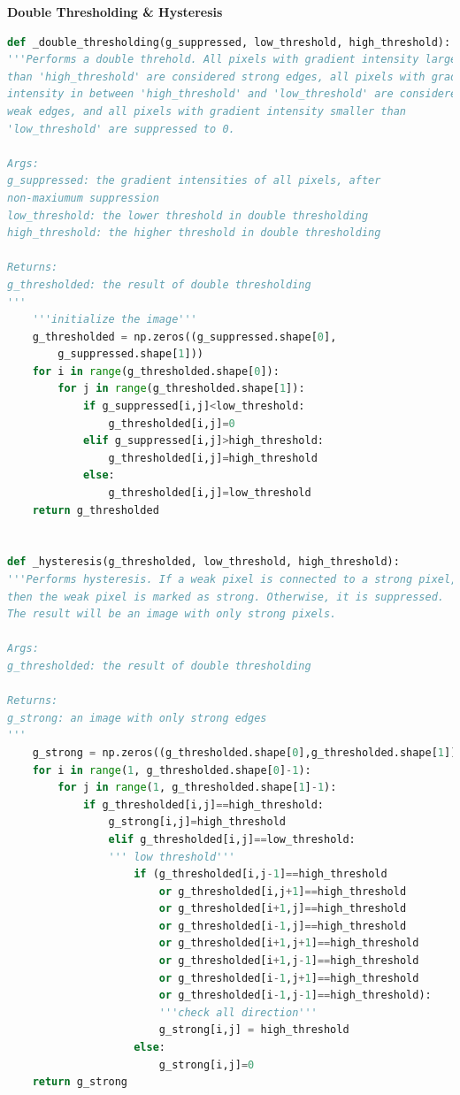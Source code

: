 \documentclass[12pt]{article}
\begin{document}
\pagebreak
\textbf{Double Thresholding \& Hysteresis}
\begin{lstlisting}[language=Python]
def _double_thresholding(g_suppressed, low_threshold, high_threshold):
'''Performs a double threhold. All pixels with gradient intensity larger
than 'high_threshold' are considered strong edges, all pixels with gradient
intensity in between 'high_threshold' and 'low_threshold' are considered
weak edges, and all pixels with gradient intensity smaller than
'low_threshold' are suppressed to 0.

Args:
g_suppressed: the gradient intensities of all pixels, after
non-maxiumum suppression
low_threshold: the lower threshold in double thresholding
high_threshold: the higher threshold in double thresholding

Returns:
g_thresholded: the result of double thresholding
'''
	'''initialize the image'''
	g_thresholded = np.zeros((g_suppressed.shape[0],
		g_suppressed.shape[1]))
	for i in range(g_thresholded.shape[0]):
		for j in range(g_thresholded.shape[1]):
			if g_suppressed[i,j]<low_threshold:
				g_thresholded[i,j]=0
			elif g_suppressed[i,j]>high_threshold:
				g_thresholded[i,j]=high_threshold
			else:
				g_thresholded[i,j]=low_threshold
	return g_thresholded


def _hysteresis(g_thresholded, low_threshold, high_threshold):
'''Performs hysteresis. If a weak pixel is connected to a strong pixel,
then the weak pixel is marked as strong. Otherwise, it is suppressed.
The result will be an image with only strong pixels.

Args:
g_thresholded: the result of double thresholding

Returns:
g_strong: an image with only strong edges
'''
	g_strong = np.zeros((g_thresholded.shape[0],g_thresholded.shape[1]))
	for i in range(1, g_thresholded.shape[0]-1):
		for j in range(1, g_thresholded.shape[1]-1):
			if g_thresholded[i,j]==high_threshold:
				g_strong[i,j]=high_threshold
				elif g_thresholded[i,j]==low_threshold: 
				''' low threshold'''
					if (g_thresholded[i,j-1]==high_threshold 
						or g_thresholded[i,j+1]==high_threshold 
						or g_thresholded[i+1,j]==high_threshold 
						or g_thresholded[i-1,j]==high_threshold 
						or g_thresholded[i+1,j+1]==high_threshold 
						or g_thresholded[i+1,j-1]==high_threshold
						or g_thresholded[i-1,j+1]==high_threshold 
						or g_thresholded[i-1,j-1]==high_threshold):
						'''check all direction'''
						g_strong[i,j] = high_threshold
					else:
						g_strong[i,j]=0
	return g_strong
	
	
	

		
\end{lstlisting}
	
\end{document}
